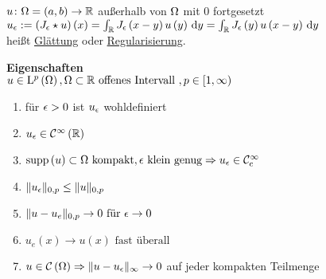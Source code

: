 \begin{definition}
	$u\colon\Omega=\left(a,b\right)\to\mathbb{R}$ außerhalb von $\Omega$ mit $0$ fortgesetzt\\
	$u_{\epsilon}:=\left(J_{\epsilon}\star u\right)\left(x\right) = \int_{\mathbb{R}} J_{\epsilon}\left(x-y\right)u\left(y\right)\,\mathrm{d}y = \int_{\mathbb{R}}J_{\epsilon}\left(y\right)u\left(x-y\right)\,\mathrm{d}y$\\
	heißt \underline{Glättung} oder \underline{Regularisierung}.
\end{definition}

\textbf{Eigenschaften}\\
$u\in\mathrm{L}^{p}\left(\Omega\right), \Omega\subset\mathbb{R} \text{ offenes Intervall }, p\in\left[1,\infty\right)$
\begin{enumerate}
	\item für $\epsilon > 0$ ist $u_{\epsilon}$ wohldefiniert
	\item $u_{\epsilon}\in\mathcal{C}^{\infty}\left(\mathbb{R}\right)${}
	\item $\operatorname{supp}\left(u\right)\subset\Omega\text{ kompakt},\epsilon\text{ klein genug}\Rightarrow u_{\epsilon}\in\mathcal{C}^{\infty}_{\text{c}}$
	\item $\|u_{\epsilon}\|_{0,p}\leq\|u\|_{0,p}$
	\item $\|u-u_{e}\|_{0,p}\to 0\text{ für }\epsilon\to 0$
	\item $u_{e}\left(x\right)\to u\left(x\right)\text{ fast überall }$
	\item $u\in\mathcal{C}\left(\Omega\right)\Rightarrow\|u-u_{\epsilon}\|_{\infty}\to 0$ auf jeder kompakten Teilmenge
\end{enumerate}

